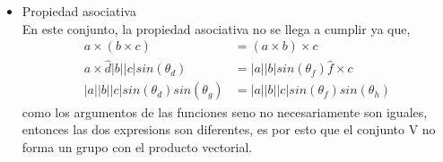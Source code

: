 \documentclass[12pt,letterpaper]{report}
\begin{document}
\begin{itemize}
\begin{itemize}
        \item Propiedad asociativa\\
        En este conjunto, la propiedad asociativa no se llega a cumplir ya que, 
        \begin{align*}
            a\times (b\times c) &= (a\times b) \times c\\
            a\times \hat{d} |b||c|sin(\theta_{d}) &= |a||b|sin(\theta_{f}) \hat{f} \times c\\
            |a||b||c| sin(\theta_{d})sin(\theta_{g}) &= |a||b||c| sin(\theta_f) sin(\theta_h)
        \end{align*}
    como los argumentos de las funciones seno no necesariamente son iguales, entonces las dos expresions son diferentes, es por esto que el conjunto V no forma un grupo con el producto vectorial.
    \end{itemize}
\end{itemize}
\end{document}
